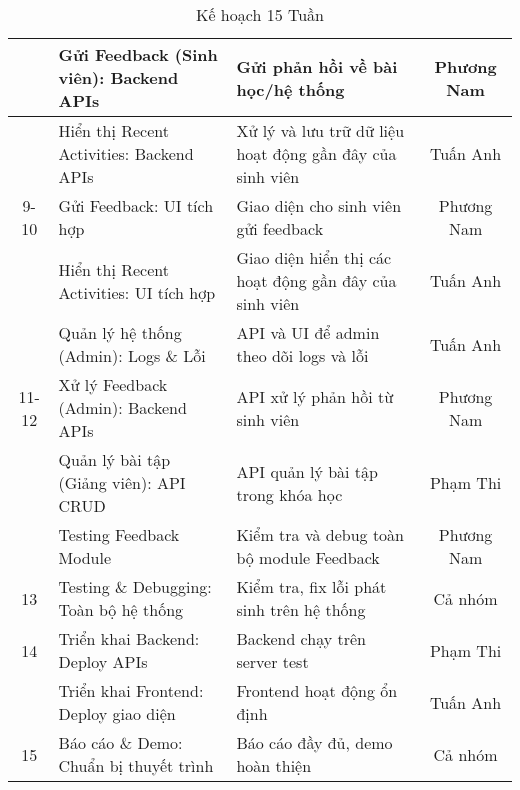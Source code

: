 \begin{table}[H]
\begin{tabular}{|c|p{4.5cm}|p{6.5cm}|c|}
        & Gửi Feedback (Sinh viên): Backend APIs & Gửi phản hồi về bài học/hệ thống & Phương Nam \\ \hline
        & Hiển thị Recent Activities: Backend APIs & Xử lý và lưu trữ dữ liệu hoạt động gần đây của sinh viên & Tuấn Anh \\ \hline
    9-10 & Gửi Feedback: UI tích hợp & Giao diện cho sinh viên gửi feedback & Phương Nam \\ \hline
        & Hiển thị Recent Activities: UI tích hợp & Giao diện hiển thị các hoạt động gần đây của sinh viên & Tuấn Anh \\ \hline
        & Quản lý hệ thống (Admin): Logs \& Lỗi & API và UI để admin theo dõi logs và lỗi & Tuấn Anh \\ \hline
    11-12 & Xử lý Feedback (Admin): Backend APIs & API xử lý phản hồi từ sinh viên & Phương Nam \\ \hline
        & Quản lý bài tập (Giảng viên): API CRUD & API quản lý bài tập trong khóa học & Phạm Thi \\ \hline
        & Testing Feedback Module & Kiểm tra và debug toàn bộ module Feedback & Phương Nam \\ \hline
    13 & Testing \& Debugging: Toàn bộ hệ thống & Kiểm tra, fix lỗi phát sinh trên hệ thống & Cả nhóm \\ \hline
    14 & Triển khai Backend: Deploy APIs & Backend chạy trên server test & Phạm Thi \\ \hline
        & Triển khai Frontend: Deploy giao diện & Frontend hoạt động ổn định & Tuấn Anh \\ \hline
    15 & Báo cáo \& Demo: Chuẩn bị thuyết trình & Báo cáo đầy đủ, demo hoàn thiện & Cả nhóm \\ \hline
    \end{tabular}
    \caption{Kế hoạch 15 Tuần}
\end{table}